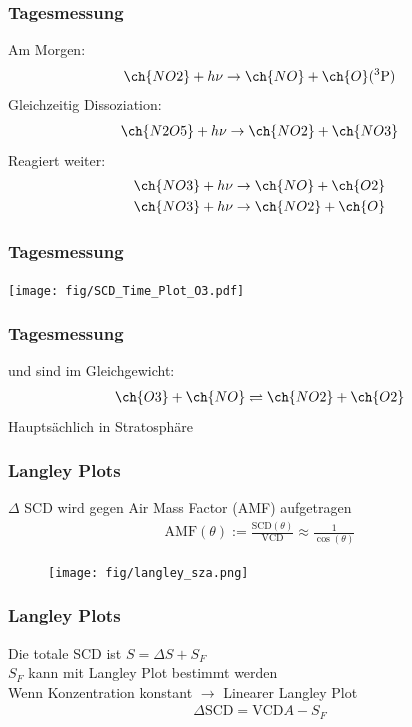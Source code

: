 \documentclass{beamer}
\begin{document}
\begin{frame}
    \frametitle{Tagesmessung }
    Am Morgen:
    \begin{align}
        \ch{NO2} + h \nu \to \ch{NO} + \ch{O}(^3\text{P})
    \end{align}
    \pause
    Gleichzeitig Dissoziation:
    \begin{align}
        \ch{N2O5} + h \nu \to \ch{NO2} + \ch{NO3}
    \end{align}
    \pause
    Reagiert weiter:
    \begin{align}
        \ch{NO3} + h \nu \to \ch{NO} + \ch{O2}\\
        \ch{NO3} + h \nu \to \ch{NO2} + \ch{O}
    \end{align}
\end{frame}

\begin{frame}
    \frametitle{Tagesmessung }
\begin{center}
    \texttt{[image: fig/SCD\_Time\_Plot\_O3.pdf]}
    \label{fig:delta_SCD_time_O3}
\end{center}
\end{frame}

\begin{frame}
    \frametitle{Tagesmessung }
     und  sind im Gleichgewicht:
    \begin{align}
         \ch{O3} + \ch{NO} \rightleftharpoons \ch{NO2} + \ch{O2}
    \end{align}
     Hauptsächlich in Stratosphäre
\end{frame}

\begin{frame}
    \frametitle{Langley Plots}
    $\Delta$ SCD wird gegen Air Mass Factor (AMF) aufgetragen\\
    \begin{align}
        \text{AMF}(\theta) := \frac{\text{SCD}(\theta)}{\text{VCD}} \approx \frac{1}{\cos (\theta)}
    \end{align}
    \begin{figure}
        \texttt{[image: fig/langley\_sza.png]}
    \end{figure}
\end{frame}

\begin{frame}
    \frametitle{Langley Plots}
    Die totale SCD ist $S = \Delta S + S_F$\\
    $S_F$ kann mit Langley Plot bestimmt werden\\
    Wenn Konzentration konstant $\to$ Linearer Langley Plot
    \begin{align}
    \Delta \text{SCD} = \text{VCD} A - S_F
    \end{align}
\end{frame}
\end{document}

